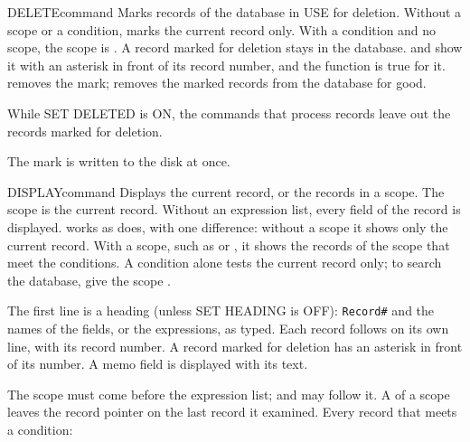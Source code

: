 \begin{XbaseEntry}{DELETE}{command}
Marks records of the database in USE for deletion.
\Syntax
{}
\Defaults
Without a scope or a condition,  marks the current record only.
With a  condition and no scope, the scope is .
\Usage
A record marked for deletion stays in the database.   and
 show it with an asterisk in front of its record number, and the
function  is true for it.   removes the mark;
 removes the marked records from the database for good.

While SET DELETED is ON, the commands that process records leave out the
records marked for deletion.

The mark is written to the disk at once.
\Examples
{}
\end{XbaseEntry}

\begin{XbaseEntry}{DISPLAY}{command}
Displays the current record, or the records in a scope.
\Syntax
{}
\Defaults
The scope is the current record.  Without an expression list, every field of
the record is displayed.
\Usage
{} works as  does, with one difference: without a scope it
shows only the current record.  With a scope, such as  or 
, it shows the records of the scope that meet the conditions.  A
 condition alone tests the current record only; to search the
database, give the scope .

The first line is a heading (unless SET HEADING is OFF): \texttt{Record\#}
and the names of the fields, or the expressions, as typed.  Each record follows
on its own line, with its record number.  A record marked for deletion has an
asterisk in front of its number.  A memo field is displayed with its text.

The scope must come before the expression list;  and  may
follow it.  A  of a scope leaves the record pointer on the last
record it examined.
\Examples
{}
Every record that meets a condition:
\end{XbaseEntry}

